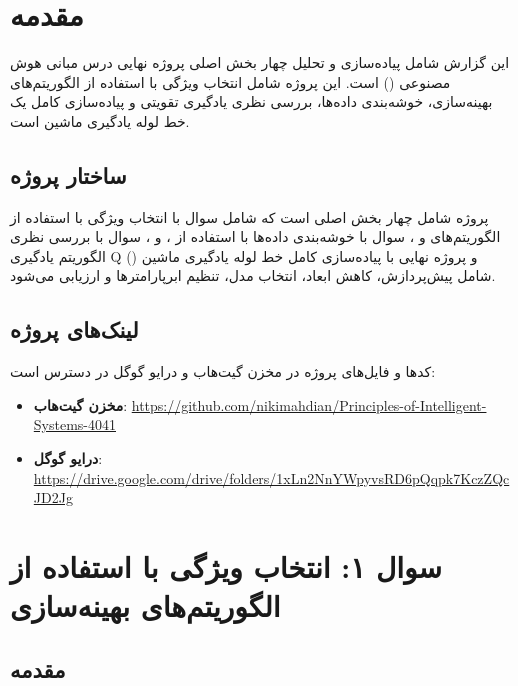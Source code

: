 \documentclass{article}
\begin{document}


\tableofcontents \clearpage
\listoffigures \clearpage
\listoftables \clearpage
\lstlistoflistings \clearpage
\newpage

\section{مقدمه}\label{Section1}

این گزارش شامل پیاده‌سازی و تحلیل چهار بخش اصلی پروژه نهایی درس مبانی هوش مصنوعی () است. این پروژه شامل انتخاب ویژگی با استفاده از الگوریتم‌های بهینه‌سازی، خوشه‌بندی داده‌ها، بررسی نظری یادگیری تقویتی و پیاده‌سازی کامل یک خط لوله یادگیری ماشین است.

\subsection{ساختار پروژه}

پروژه شامل چهار بخش اصلی است که شامل سوال  با انتخاب ویژگی با استفاده از الگوریتم‌های  و ، سوال  با خوشه‌بندی داده‌ها با استفاده از ،  و ، سوال  با بررسی نظری الگوریتم یادگیری Q () و پروژه نهایی با پیاده‌سازی کامل خط لوله یادگیری ماشین شامل پیش‌پردازش، کاهش ابعاد، انتخاب مدل، تنظیم ابرپارامترها و ارزیابی می‌شود.

\subsection{لینک‌های پروژه}

کدها و فایل‌های پروژه در مخزن گیت‌هاب و درایو گوگل در دسترس است:

\begin{itemize}
    \item \textbf{مخزن گیت‌هاب}: \url{https://github.com/nikimahdian/Principles-of-Intelligent-Systems-4041}
    \item \textbf{درایو گوگل}: \url{https://drive.google.com/drive/folders/1xLn2NnYWpyvsRD6pQqpk7KczZQcJD2Jg}
\end{itemize}

\section{سوال ۱: انتخاب ویژگی با استفاده از الگوریتم‌های بهینه‌سازی}\label{Section:Q1}

\subsection{مقدمه}
\end{document}
